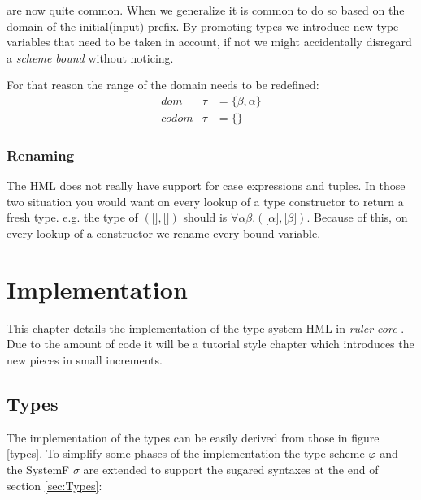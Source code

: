 \documentclass[twoside, titlepage, openright, a4paper]{book}
\newcommand{\rcore}{\emph{ruler-core }}
\begin{document}
are now quite common. When we generalize it is common to do so based on the domain of the initial(input) prefix. By promoting types we introduce new type variables that need to be taken in account, if not we might accidentally disregard a \emph{scheme bound} without noticing.

For that reason the range of the domain needs to be redefined:
\begin{eqnarray*}
dom   &\tau& = \{\beta, \alpha\}\\
codom &\tau& = \{\}
\end{eqnarray*}
\subsection{Renaming}
\label{renaming}

The HML does not really have support for case expressions and tuples. In those two situation you would want on every lookup of a type constructor to return a fresh type. e.g. the type of $(\lbrack \rbrack, \lbrack \rbrack)$ should is $\forall \alpha \beta . (\lbrack \alpha \rbrack, \lbrack \beta \rbrack)$. Because of this, on every lookup of a constructor we rename every bound variable.

\chapter{Implementation}
This chapter details the implementation of the type system HML in \rcore. Due to the amount of code it will be a tutorial style chapter which introduces the new pieces in small increments.
\section{Types}
The implementation of the types can be easily derived from those in figure \ref{types}. To simplify some phases of the implementation the type scheme $\varphi$ and the SystemF $\sigma$ are extended to support the sugared syntaxes at the end of section \ref{sec:Types}:
\end{document}
